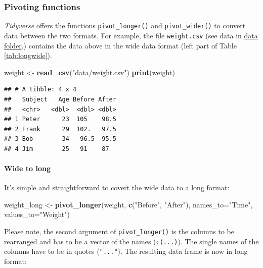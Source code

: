 \documentclass[
]{scrartcl}
\newenvironment{Shaded}{\begin{snugshade}}{\end{snugshade}}
\newcommand{\AttributeTok}[1]{\textcolor[rgb]{0.13,0.29,0.53}{#1}}
\newcommand{\FunctionTok}[1]{\textcolor[rgb]{0.13,0.29,0.53}{\textbf{#1}}}
\newcommand{\NormalTok}[1]{#1}
\newcommand{\OtherTok}[1]{\textcolor[rgb]{0.56,0.35,0.01}{#1}}
\newcommand{\StringTok}[1]{\textcolor[rgb]{0.31,0.60,0.02}{#1}}
\begin{document}
\subsubsection{Pivoting functions}\label{pivoting-functions}

\emph{Tidyverse} offers the functions \texttt{pivot\_longer()} and \texttt{pivot\_wider()} to convert data between the two formats. For example, the file \texttt{weight.csv} (see data in \href{https://surfdrive.surf.nl/s/EBXYmGdYHiY9eoG}{data folder}.) contains the data above in the wide data format (left part of Table \ref{tab:longwide}).

\begin{Shaded}
\begin{Highlighting}[]
\NormalTok{weight }\OtherTok{\textless{}{-}} \FunctionTok{read\_csv}\NormalTok{(}\StringTok{"data/weight.csv"}\NormalTok{)}
\FunctionTok{print}\NormalTok{(weight)}
\end{Highlighting}
\end{Shaded}

\begin{verbatim}
## # A tibble: 4 x 4
##   Subject   Age Before After
##   <chr>   <dbl>  <dbl> <dbl>
## 1 Peter      23  105    98.5
## 2 Frank      29  102.   97.5
## 3 Bob        34   96.5  95.5
## 4 Jim        25   91    87
\end{verbatim}

\paragraph*{Wide to long}\label{wide-to-long}

It's simple and straightforward to covert the wide data to a long format:

\begin{Shaded}
\begin{Highlighting}[]
\NormalTok{weight\_long }\OtherTok{\textless{}{-}} \FunctionTok{pivot\_longer}\NormalTok{(weight, }\FunctionTok{c}\NormalTok{(}\StringTok{"Before"}\NormalTok{, }\StringTok{"After"}\NormalTok{), }\AttributeTok{names\_to=}\StringTok{"Time"}\NormalTok{, }\AttributeTok{values\_to=}\StringTok{"Weight"}\NormalTok{)}
\end{Highlighting}
\end{Shaded}

Please note, the second argument of \texttt{pivot\_longer()} is the columns to be rearranged and has to be a vector of the names (\texttt{c(...)}). The single names of the columns have to be in quotes (\texttt{"..."}). The resulting data frame is now in long format:
\end{document}
